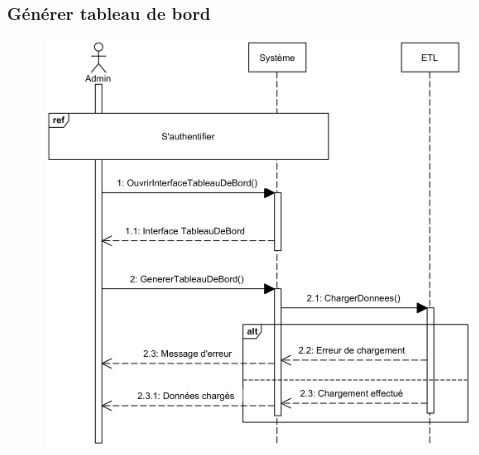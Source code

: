     \subsubsection[Générer tableau de bord]{Générer tableau de bord}
        \begin{figure}[H]
            \centering
            \includegraphics[width=130mm]{images/diagramme-de-sequence/sd-gene-dashboard.png}
            \label{fig:sdGenTab}
        \end{figure}
\pagebreak
